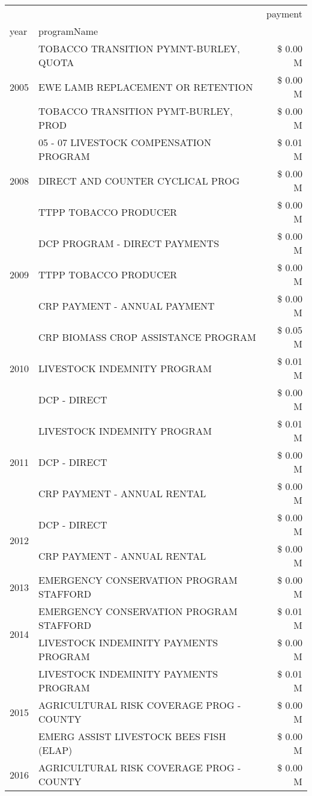 \begin{tabular}{llr}
\toprule
 &  & payment \\
year & programName &  \\
\midrule
\multirow[t]{3}{*}{2005} & TOBACCO TRANSITION PYMNT-BURLEY, QUOTA & \$ 0.00 M \\
 & EWE LAMB REPLACEMENT OR RETENTION & \$ 0.00 M \\
 & TOBACCO TRANSITION PYMT-BURLEY, PROD & \$ 0.00 M \\
\cline{1-3}
\multirow[t]{3}{*}{2008} & 05 - 07 LIVESTOCK COMPENSATION PROGRAM & \$ 0.01 M \\
 & DIRECT AND COUNTER CYCLICAL PROG & \$ 0.00 M \\
 & TTPP TOBACCO PRODUCER & \$ 0.00 M \\
\cline{1-3}
\multirow[t]{3}{*}{2009} & DCP PROGRAM - DIRECT PAYMENTS & \$ 0.00 M \\
 & TTPP TOBACCO PRODUCER & \$ 0.00 M \\
 & CRP PAYMENT - ANNUAL PAYMENT & \$ 0.00 M \\
\cline{1-3}
\multirow[t]{3}{*}{2010} & CRP BIOMASS CROP ASSISTANCE PROGRAM & \$ 0.05 M \\
 & LIVESTOCK INDEMNITY PROGRAM & \$ 0.01 M \\
 & DCP - DIRECT & \$ 0.00 M \\
\cline{1-3}
\multirow[t]{3}{*}{2011} & LIVESTOCK INDEMNITY PROGRAM & \$ 0.01 M \\
 & DCP - DIRECT & \$ 0.00 M \\
 & CRP PAYMENT - ANNUAL RENTAL & \$ 0.00 M \\
\cline{1-3}
\multirow[t]{2}{*}{2012} & DCP - DIRECT & \$ 0.00 M \\
 & CRP PAYMENT - ANNUAL RENTAL & \$ 0.00 M \\
\cline{1-3}
2013 & EMERGENCY CONSERVATION PROGRAM STAFFORD & \$ 0.00 M \\
\cline{1-3}
\multirow[t]{2}{*}{2014} & EMERGENCY CONSERVATION PROGRAM STAFFORD & \$ 0.01 M \\
 & LIVESTOCK INDEMINITY PAYMENTS PROGRAM & \$ 0.00 M \\
\cline{1-3}
\multirow[t]{3}{*}{2015} & LIVESTOCK INDEMINITY PAYMENTS PROGRAM & \$ 0.01 M \\
 & AGRICULTURAL RISK COVERAGE PROG - COUNTY & \$ 0.00 M \\
 & EMERG ASSIST LIVESTOCK BEES FISH (ELAP) & \$ 0.00 M \\
\cline{1-3}
\multirow[t]{2}{*}{2016} & AGRICULTURAL RISK COVERAGE PROG - COUNTY & \$ 0.00 M \\

\end{tabular}
